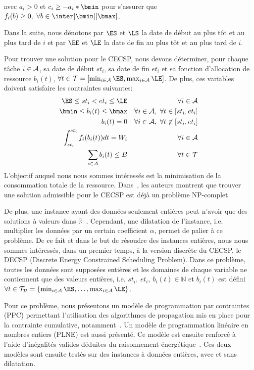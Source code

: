   \noindent
  avec $a_i>0$ et $c_i \geq -a_i*\bmin $ pour
  s'assurer que $f_i(b) \geq 0,\ \forall b \in \inter[\bmin][\bmax]$.

Dans la suite, nous dénotons par $\ES$ et $\LS$
la date de début au plus tôt et au plus tard de $i$ et par
$\EE$ et $\LE$ la date de fin au plus tôt et au
plus tard de $i$.

Pour trouver une solution pour le CECSP, nous devons déterminer, pour
chaque tâche $i \in {\cal A}$, sa date de début $st_i$, sa date de fin
$et_i$ et sa fonction d'allocation de ressource $b_i(t)$, $\forall t
\in {\cal T}=[\min_{i\in{\cal A}} \ES, \max_{i\in {\cal
    A}} \LE]$. De plus, ces variables doivent satisfaire
les contraintes suivantes:
\begin{eqnarray} 
  \ES\le st_i < et_i \le \LE & & \forall i \in
{\cal A} \label {tw_CECSP}\\
  \bmin \le b_i(t) \le \bmax & & \forall i \in {\cal A},\
\forall t \in [st_i,et_i] \label {bminmax_CECSP}\\
  b_i(t)=0 & & \forall i \in {\cal A},\ \forall t \not\in
[st_i,et_i] \label {b0_CECSP}\\
  \int_{st_i}^{et_i} f_i(b_i(t))dt =W_i & & \forall i \in {\cal
A} \label{nrj_CECSP}\\
  \sum_{i \in {\cal A}} b_i(t) \le B & & \forall t \in {\cal
T} \label{res_CECSP}
\end{eqnarray}
L'objectif auquel nous nous sommes intéressés est la minimisation de
la consommation totale de la ressource. Dans~\cite{Nattaf2015}, les
auteurs montrent que trouver une solution admissible pour le CECSP est
déjà un problème NP-complet. 

De plus, une instance ayant des données seulement entières peut
n'avoir que des solutions à valeurs dans
$\mathbb{R}$~\cite{Nattaf2015}. Cependant, une dilatation de
l'instance, i.e. multiplier les données par un certain coefficient
$\alpha$, permet de palier à ce problème. 
De ce fait et dans le but de résoudre des instances entières, nous
nous sommes intéressés, dans un premier temps, à la version discrète
du CECSP, le DECSP (Discrete Energy Constrained Scheduling
Problem). Dans ce problème, toutes les données sont supposées entières
et les domaines de chaque variable ne contiennent
que des valeurs entières, i.e. $st_i,\ et_i,\ b_i(t) \in \mathbb{N}$ et
$b_i(t)$ est défini $\forall t \in {\cal T}_{\cal D}=\{\min_{i\in{\cal
A}} \ES,\dots, \max_{i\in {\cal A}} \LE\}$. 

Pour ce problème, nous présentons un modèle de
programmation par contraintes (PPC) permettant l'utilisation des
algorithmes de propagation mis en place pour la contrainte
cumulative, notamment~\cite{Gay2015}.  Un modèle de
programmation linéaire en nombres entiers (PLNE) est aussi
présenté. Ce modèle est ensuite renforcé à l'aide d'inégalités
valides déduites du raisonnement énergétique~\cite{Lopez1990}. 
Ces deux modèles sont ensuite testés sur des instances à données
entières, avec et sans dilatation.

